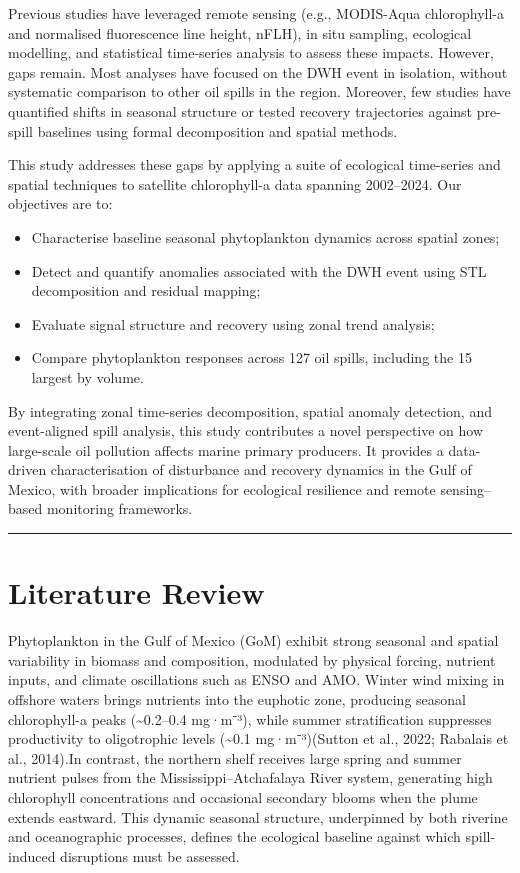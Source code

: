 \documentclass[
  11pt,
]{article}
\begin{document}
Previous studies have leveraged remote sensing (e.g., MODIS-Aqua
chlorophyll-a and normalised fluorescence line height, nFLH), in situ
sampling, ecological modelling, and statistical time-series analysis to
assess these impacts. However, gaps remain. Most analyses have focused
on the DWH event in isolation, without systematic comparison to other
oil spills in the region. Moreover, few studies have quantified shifts
in seasonal structure or tested recovery trajectories against pre-spill
baselines using formal decomposition and spatial methods.

This study addresses these gaps by applying a suite of ecological
time-series and spatial techniques to satellite chlorophyll-a data
spanning 2002--2024. Our objectives are to:

\begin{itemize}
\item
  Characterise baseline seasonal phytoplankton dynamics across spatial
  zones;
\item
  Detect and quantify anomalies associated with the DWH event using STL
  decomposition and residual mapping;
\item
  Evaluate signal structure and recovery using zonal trend analysis;
\item
  Compare phytoplankton responses across 127 oil spills, including the
  15 largest by volume.
\end{itemize}

By integrating zonal time-series decomposition, spatial anomaly
detection, and event-aligned spill analysis, this study contributes a
novel perspective on how large-scale oil pollution affects marine
primary producers. It provides a data-driven characterisation of
disturbance and recovery dynamics in the Gulf of Mexico, with broader
implications for ecological resilience and remote sensing--based
monitoring frameworks.

\begin{center}\rule{0.5\linewidth}{0.5pt}\end{center}

\section{Literature Review}\label{literature-review}

Phytoplankton in the Gulf of Mexico (GoM) exhibit strong seasonal and
spatial variability in biomass and composition, modulated by physical
forcing, nutrient inputs, and climate oscillations such as ENSO and AMO.
Winter wind mixing in offshore waters brings nutrients into the euphotic
zone, producing seasonal chlorophyll-a peaks (\textasciitilde0.2--0.4
mg·m⁻³), while summer stratification suppresses productivity to
oligotrophic levels (\textasciitilde0.1 mg·m⁻³)(Sutton et al., 2022;
Rabalais et al., 2014).In contrast, the northern shelf receives large
spring and summer nutrient pulses from the Mississippi--Atchafalaya
River system, generating high chlorophyll concentrations and occasional
secondary blooms when the plume extends eastward. This dynamic seasonal
structure, underpinned by both riverine and oceanographic processes,
defines the ecological baseline against which spill-induced disruptions
must be assessed.
\end{document}
